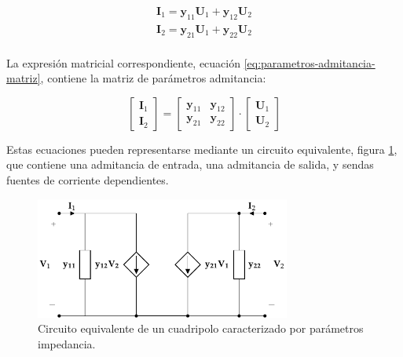 \begin{equation}
  \label{eq:parametros-admitancia}
  \begin{array}{l}
  \mathbf{I}_1 = \mathbf{y}_{11} \mathbf{U}_1 + \mathbf{y}_{12} \mathbf{U}_2\\
  \mathbf{I}_2 = \mathbf{y}_{21} \mathbf{U}_1 + \mathbf{y}_{22} \mathbf{U}_2\\
  \end{array}
\end{equation}

La expresión matricial correspondiente, ecuación \ref{eq:parametros-admitancia-matriz}, contiene la matriz de parámetros admitancia:


\begin{equation}
  \label{eq:parametros-admitancia-matriz}
  \left[
    \begin{array}{c}
      \mathbf{I}_1\\
      \mathbf{I}_2
    \end{array}
  \right] =
  \left[
    \begin{array}{cc}
      \mathbf{y}_{11} & \mathbf{y}_{12}\\
      \mathbf{y}_{21} & \mathbf{y}_{22}
    \end{array}
  \right] \cdot
  \left[
    \begin{array}{c}
      \mathbf{U}_1\\
      \mathbf{U}_2
    \end{array}
  \right]
\end{equation}

Estas ecuaciones pueden representarse mediante un circuito equivalente, figura \ref{fig:circuito-equivalente-admitancia}, que contiene una admitancia de entrada, una admitancia de salida, y sendas fuentes de corriente dependientes.

\begin{figure}[H]
  \centering
  \includegraphics[height=4cm]{../figs/circuitoEquivalenteY.pdf}
  \caption{Circuito equivalente de un cuadripolo caracterizado por parámetros impedancia.}
  \label{fig:circuito-equivalente-admitancia}
\end{figure}


